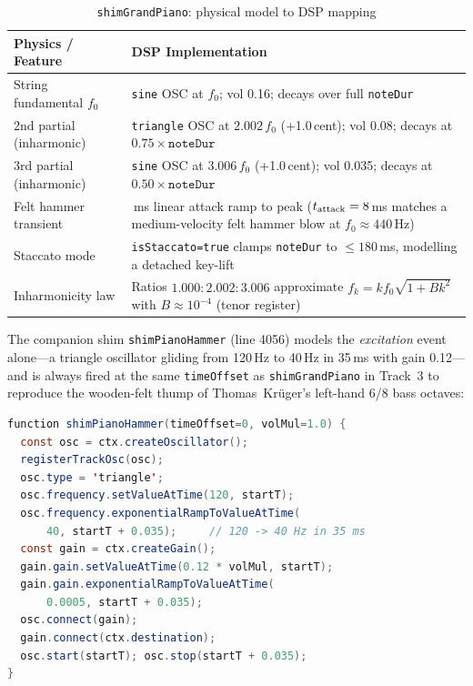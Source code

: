 \documentclass[10pt,journal,compsoc,twocolumn]{article}
\begin{document}
\begin{table}[h]
\centering
\caption{\texttt{shimGrandPiano}: physical model to DSP mapping}
\label{tab:piano_components}
\scriptsize
\setlength{\tabcolsep}{3pt}
\renewcommand{\arraystretch}{1.12}
\begin{tabularx}{\columnwidth}{@{}
  >{\raggedright\arraybackslash}p{2.0cm}
  >{\raggedright\arraybackslash}X
@{}}
\toprule
\textbf{Physics / Feature} & \textbf{DSP Implementation} \\
\midrule
String fundamental $f_0$ &
\texttt{sine} OSC at $f_0$; vol 0.16; decays over full
\texttt{noteDur} \\
2nd partial (inharmonic) &
\texttt{triangle} OSC at $2.002\,f_0$ (+1.0\,cent); vol 0.08;
decays at $0.75\times\texttt{noteDur}$ \\
3rd partial (inharmonic) &
\texttt{sine} OSC at $3.006\,f_0$ (+1.0\,cent); vol 0.035;
decays at $0.50\times\texttt{noteDur}$ \\
Felt hammer transient &
8\,ms linear attack ramp to peak ($t_{\rm attack}=8\,$ms
matches a medium-velocity felt hammer blow at $f_0 \approx 440$\,Hz) \\
Staccato mode &
\texttt{isStaccato=true} clamps \texttt{noteDur} to
$\leq 180$\,ms, modelling a detached key-lift \\
Inharmonicity law &
Ratios $1.000:2.002:3.006$ approximate
$f_k = kf_0\sqrt{1+Bk^2}$ with $B \approx 10^{-4}$ (tenor
register)~\cite{fletcher1998physics} \\
\bottomrule
\end{tabularx}
\end{table}

The companion shim \texttt{shimPianoHammer} (line 4056) models the
\emph{excitation} event alone---a triangle oscillator gliding from 120\,Hz to
40\,Hz in 35\,ms with gain 0.12---and is always fired at the same
\texttt{timeOffset} as \texttt{shimGrandPiano} in Track~3 to reproduce the
wooden-felt thump of Thomas~Kr\"{u}ger's left-hand 6/8 bass octaves:

\begin{lstlisting}[language=Java,
    caption={\texttt{shimPianoHammer}: felt key-strike exciter (line 4056).}]
function shimPianoHammer(timeOffset=0, volMul=1.0) {
  const osc = ctx.createOscillator();
  registerTrackOsc(osc);
  osc.type = 'triangle';
  osc.frequency.setValueAtTime(120, startT);
  osc.frequency.exponentialRampToValueAtTime(
      40, startT + 0.035);     // 120 -> 40 Hz in 35 ms
  const gain = ctx.createGain();
  gain.gain.setValueAtTime(0.12 * volMul, startT);
  gain.gain.exponentialRampToValueAtTime(
      0.0005, startT + 0.035);
  osc.connect(gain);
  gain.connect(ctx.destination);
  osc.start(startT); osc.stop(startT + 0.035);
}
\end{lstlisting}
\end{document}

